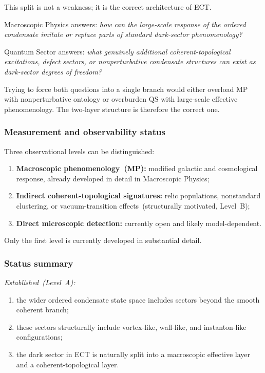 This split is not a weakness; it is the correct architecture of ECT.

Macroscopic Physics answers: \emph{how can the large-scale response of
the ordered condensate imitate or replace parts of standard dark-sector
phenomenology?}

Quantum Sector answers: \emph{what genuinely additional
coherent-topological excitations, defect sectors, or nonperturbative
condensate structures can exist as dark-sector degrees of freedom?}

Trying to force both questions into a single branch would either
overload MP with nonperturbative ontology or overburden QS with
large-scale effective phenomenology.
The two-layer structure is therefore the correct one.

\subsubsection*{Measurement and observability status}

Three observational levels can be distinguished:
\begin{enumerate}[label=(\roman*)]
  \item \textbf{Macroscopic phenomenology~(MP):}
    modified galactic and cosmological response, already developed in
    detail in Macroscopic Physics;
  \item \textbf{Indirect coherent-topological signatures:}
    relic populations, nonstandard clustering, or vacuum-transition
    effects~(structurally motivated, Level~B);
  \item \textbf{Direct microscopic detection:}
    currently open and likely model-dependent.
\end{enumerate}
Only the first level is currently developed in substantial detail.

\subsubsection*{Status summary}

\textit{Established~(Level~A):}
\begin{enumerate}[label=(\roman*)]
  \item the wider ordered condensate state space includes sectors beyond
    the smooth coherent branch;
  \item these sectors structurally include vortex-like, wall-like, and
    instanton-like configurations;
  \item the dark sector in ECT is naturally split into a macroscopic
    effective layer and a coherent-topological layer.
\end{enumerate}

